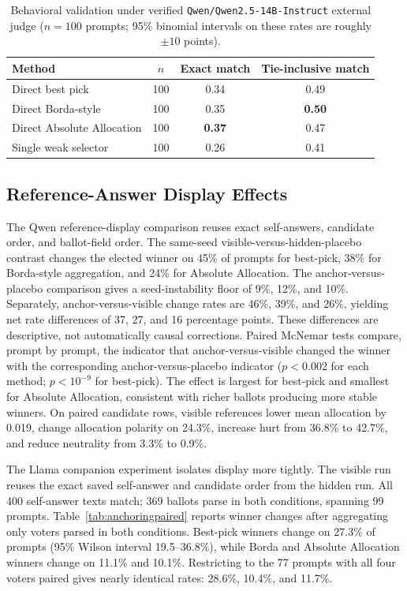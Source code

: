 \documentclass[11pt]{article}
\begin{document}
\begin{table}[h]
\centering
\begin{tabular}{lccc}
\toprule
Method & $n$ & Exact match & Tie-inclusive match \\
\midrule
Direct best pick & 100 & 0.34 & 0.49 \\
Direct Borda-style & 100 & 0.35 & \textbf{0.50} \\
Direct Absolute Allocation & 100 & \textbf{0.37} & 0.47 \\
Single weak selector & 100 & 0.26 & 0.41 \\
\bottomrule
\end{tabular}
\caption{Behavioral validation under verified
\texttt{Qwen/Qwen2.5-14B-Instruct} external judge ($n=100$ prompts; 95\%
binomial intervals on these rates are roughly $\pm 10$ points).}
\label{tab:main14b}
\end{table}

\subsection{Reference-Answer Display Effects}

The Qwen reference-display comparison reuses exact self-answers, candidate order, and
ballot-field order. The same-seed visible-versus-hidden-placebo contrast changes
the elected winner on 45\% of prompts for best-pick, 38\% for Borda-style
aggregation, and 24\% for Absolute Allocation. The anchor-versus-placebo
comparison gives a seed-instability floor of 9\%, 12\%, and 10\%. Separately,
anchor-versus-visible change rates are 46\%, 39\%, and 26\%, yielding net rate
differences of 37, 27, and 16 percentage points. These differences are
descriptive, not automatically causal corrections. Paired McNemar tests
compare, prompt by prompt, the indicator that anchor-versus-visible changed the
winner with the corresponding anchor-versus-placebo indicator ($p<0.002$ for
each method; $p<10^{-9}$ for best-pick). The effect is largest for best-pick and
smallest for Absolute Allocation, consistent with richer ballots producing more
stable winners. On paired candidate rows, visible references lower mean allocation
by 0.019, change allocation polarity on 24.3\%, increase hurt from 36.8\% to
42.7\%, and reduce neutrality from 3.3\% to 0.9\%.

The Llama companion experiment isolates display more tightly. The visible run reuses
the exact saved self-answer and candidate order from the hidden run. All
400 self-answer texts match; 369 ballots parse in both conditions, spanning 99
prompts. Table~\ref{tab:anchoringpaired} reports winner changes after
aggregating only voters parsed in both conditions. Best-pick winners change on
27.3\% of prompts (95\% Wilson interval 19.5--36.8\%), while Borda and
Absolute Allocation winners change on 11.1\% and 10.1\%. Restricting to the
77 prompts with all four voters paired gives nearly identical rates: 28.6\%,
10.4\%, and 11.7\%.
\end{document}
